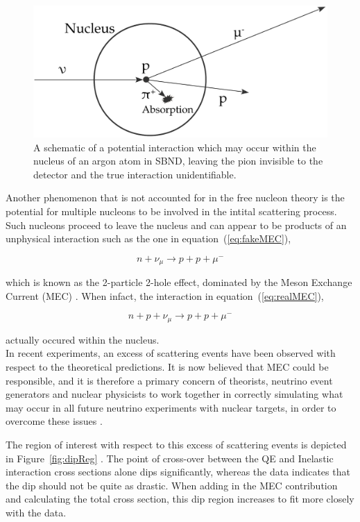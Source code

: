     \begin{figure}[h!]
        \centering
        \includegraphics[width=.6\textwidth]{images/inter_nuc.pdf}
        \caption{A schematic of a potential interaction which may occur within the nucleus of an argon atom in SBND, leaving the pion invisible to the detector and the true interaction unidentifiable.}
        \label{fig:interNuc}
    \end{figure}

Another phenomenon that is not accounted for in the free nucleon theory is the potential for multiple nucleons to be involved in the intital scattering process. Such nucleons proceed to leave the nucleus and can appear to be products of an unphysical interaction such as the one in equation~(\ref{eq:fakeMEC}),

    \begin{equation}\label{eq:fakeMEC}
        n + \nu_{\mu} \longrightarrow p + p + \mu^{-}
    \end{equation}

    which is known as the 2-particle 2-hole effect, dominated by the Meson Exchange Current (MEC) \cite{MEC}. When infact, the interaction in equation~(\ref{eq:realMEC}),
    
    \begin{equation}\label{eq:realMEC}
        n + p + \nu_{\mu} \longrightarrow p + p + \mu^{-}
    \end{equation}

    actually occured within the nucleus. \\

    In recent experiments, an excess of scattering events have been observed with respect to the theoretical predictions. It is now believed that MEC could be responsible, and it is therefore a primary concern of theorists, neutrino event generators and nuclear physicists to work together in correctly simulating what may occur in all future neutrino experiments with nuclear targets, in order to overcome these issues \cite{MEC}.

    The region of interest with respect to this excess of scattering events is depicted in Figure~\ref{fig:dipReg} \cite{dipReg}. The point of cross-over between the QE and Inelastic interaction cross sections alone dips significantly, whereas the data indicates that the dip should not be quite as drastic. When adding in the MEC contribution and calculating the total cross section, this dip region increases to fit more closely with the data.  

